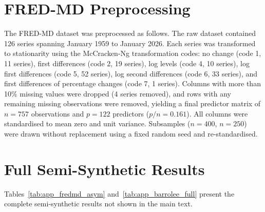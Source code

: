 \documentclass[a4paper,10.5pt]{article}
\begin{document}
\section{FRED-MD Preprocessing}\label{app:fredmd}

The FRED-MD dataset \citep{mccracken2016} was preprocessed as follows. The raw dataset contained 126 series spanning January 1959 to January 2026. Each series was transformed to stationarity using the McCracken-Ng transformation codes: no change (code 1, 11 series), first differences (code 2, 19 series), log levels (code 4, 10 series), log first differences (code 5, 52 series), log second differences (code 6, 33 series), and first differences of percentage changes (code 7, 1 series). Columns with more than 10\% missing values were dropped (4 series removed), and rows with any remaining missing observations were removed, yielding a final predictor matrix of $n = 757$ observations and $p = 122$ predictors ($p/n = 0.161$). All columns were standardised to mean zero and unit variance. Subsamples ($n = 400$, $n = 250$) were drawn without replacement using a fixed random seed and re-standardised.


\section{Full Semi-Synthetic Results}\label{app:semi_results}

Tables~\ref{tab:app_fredmd_asym} and~\ref{tab:app_barrolee_full} present the complete semi-synthetic results not shown in the main text.
\end{document}

